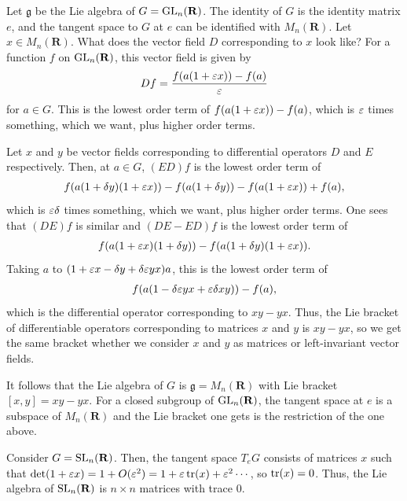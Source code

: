 \documentclass [11 pt, twoside] {article}
\begin{document}
\iffalse
\begin{example}[ ]\label{}\text{}
Let $\mathfrak{g}$ be the Lie algebra of $G = \operatorname{GL}_{n}(\mathbf{R})$. The identity of $G$ is the identity matrix $e$, and the tangent space to $G$ at $e$ can be identified with $M_{n}(\mathbf{R})$.
Let $x\in M_{n}(\mathbf{R})$. What does the vector field $D$ corresponding to $x$ look like?
For a function $f$ on $\operatorname{GL}_{n}(\mathbf{R})$, this vector field is given by
\begin{align*}
	Df = \frac{f(a(1+\varepsilon x)) - f(a)}{\varepsilon}
\end{align*}
for $a\in G$.
This is the lowest order term of $f(a (1+\varepsilon x)) - f(a)$, which is $\varepsilon$ times something, which we want, plus higher order terms.

Let $x$ and $y$ be vector fields corresponding to differential operators $D$ and $E$ respectively.
Then, at $a\in G$, $(ED)f$ is the lowest order term of
\begin{align*}
	f(a(1+\delta y) (1+\varepsilon x)) - f(a(1+\delta y)) - f(a(1+\varepsilon x)) + f(a),
\end{align*}
which is $\varepsilon\delta$ times something, which we want, plus higher order terms.
One sees that $(DE)f$ is similar and $(DE-ED)f$ is the lowest order term of 
\begin{align*}
	f(a(1+\varepsilon x) (1+\delta y)) - f(a(1+\delta y) (1+\varepsilon x)).
\end{align*}
Taking $a$ to $(1+\varepsilon x-\delta y + \delta \varepsilon yx)a$, this is the lowest order term of
\begin{align*}
	f(a(1-\delta\varepsilon yx + \varepsilon\delta xy)) - f(a),
\end{align*}
which is the differential operator corresponding to $xy-yx$. Thus, the Lie bracket of differentiable operators corresponding to matrices $x$ and $y$ is $xy-yx$, so we get the same bracket whether we consider $x$ and $y$ as matrices or left-invariant vector fields.  

It follows that the Lie algebra of $G$ is $\mathfrak{g} = M_{n}(\mathbf{R})$ with Lie bracket $[x,y] = xy-yx$.
For a closed subgroup of $\operatorname{GL}_{n}(\mathbf{R})$, the tangent space at $e$ is a subspace of $M_{n}(\mathbf{R})$ and the Lie bracket one gets is the restriction of the one above.
\end{example}

\begin{example}[ ]\label{}\text{}
Consider $G=\operatorname{SL}_{n}(\mathbf{R})$. Then, the tangent space $T_{e}G$ consists of matrices $x$ such that $\det(1+\varepsilon x) = 1 + O (\varepsilon^{2}) = 1 + \varepsilon \operatorname{tr}(x) + \varepsilon ^{2}\cdots$, so $\operatorname{tr}(x)=0$.
Thus, the Lie algebra of $\operatorname{SL}_{n}(\mathbf{R})$ is $n\times n$ matrices with trace $0$.
\end{example}
\end{document}
